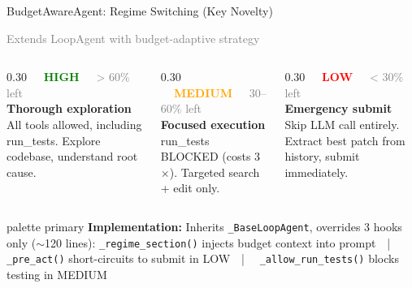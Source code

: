 \documentclass[aspectratio=169, 12pt]{beamer}
\begin{document}
\begin{frame}{BudgetAwareAgent: Regime Switching {\small\textcolor{accent}{(Key Novelty)}}}

{\small\textcolor{gray}{Extends LoopAgent with budget-adaptive strategy}}

\vspace{0.3cm}
\begin{columns}[T]
  \begin{column}{0.30\textwidth}
    {\footnotesize\colorbox{green!15}{\textcolor{green}{\textbf{~~HIGH~~}}}
    \textcolor{gray}{> 60\% left}}\\[0.15cm]
    {\footnotesize\textbf{Thorough exploration}\\[0.1cm]
    All tools allowed, including run\_tests. Explore codebase, understand root cause.}
  \end{column}
  \begin{column}{0.30\textwidth}
    {\footnotesize\colorbox{orange!15}{\textcolor{orange}{\textbf{~~MEDIUM~~}}}
    \textcolor{gray}{30--60\% left}}\\[0.15cm]
    {\footnotesize\textbf{Focused execution}\\[0.1cm]
    run\_tests BLOCKED (costs 3$\times$). Targeted search + edit only.}
  \end{column}
  \begin{column}{0.30\textwidth}
    {\footnotesize\colorbox{red!15}{\textcolor{red}{\textbf{~~LOW~~}}}
    \textcolor{gray}{< 30\% left}}\\[0.15cm]
    {\footnotesize\textbf{Emergency submit}\\[0.1cm]
    Skip LLM call entirely. Extract best patch from history, submit immediately.}
  \end{column}
\end{columns}

\vspace{0.4cm}
\begin{beamercolorbox}[wd=\textwidth, rounded=true, sep=6pt]{palette primary}
  {\footnotesize\textbf{Implementation:} Inherits \texttt{\_BaseLoopAgent}, overrides 3 hooks only ($\sim$120 lines):
  \texttt{\_regime\_section()} injects budget context into prompt~~|~~
  \texttt{\_pre\_act()} short-circuits to submit in LOW~~|~~
  \texttt{\_allow\_run\_tests()} blocks testing in MEDIUM}
\end{beamercolorbox}

\end{frame}
\end{document}
